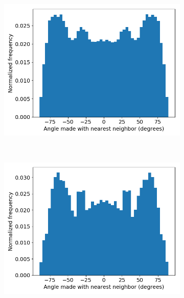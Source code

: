 \documentclass{article}
\begin{document}
  \begin{figure}[ht]
  \centering
  \begin{subfigure}{0.3\linewidth}
        \centering
        \includegraphics[width=\linewidth]{offset_tail_packing.png}
        \caption{}~\label{fig:offset_tails}
  \end{subfigure}
  \begin{subfigure}{0.3\linewidth}
        \centering
        \includegraphics[width=\linewidth]{angles_traj_layered.png}
        \caption{}~\label{fig:layered_tails}
  \end{subfigure}
  \begin{subfigure}{0.3\linewidth}
        \centering

\end{subfigure}
\end{figure}
\end{document}
